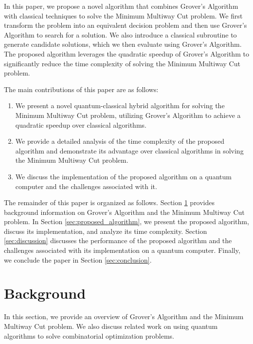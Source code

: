In this paper, we propose a novel algorithm that combines Grover's Algorithm with classical techniques to solve the Minimum Multiway Cut problem. We first transform the problem into an equivalent decision problem and then use Grover's Algorithm to search for a solution. We also introduce a classical subroutine to generate candidate solutions, which we then evaluate using Grover's Algorithm. The proposed algorithm leverages the quadratic speedup of Grover's Algorithm to significantly reduce the time complexity of solving the Minimum Multiway Cut problem.

The main contributions of this paper are as follows:

\begin{enumerate}
    \item We present a novel quantum-classical hybrid algorithm for solving the Minimum Multiway Cut problem, utilizing Grover's Algorithm to achieve a quadratic speedup over classical algorithms.
    
    \item We provide a detailed analysis of the time complexity of the proposed algorithm and demonstrate its advantage over classical algorithms in solving the Minimum Multiway Cut problem.
    
    \item We discuss the implementation of the proposed algorithm on a quantum computer and the challenges associated with it.
\end{enumerate}

The remainder of this paper is organized as follows. Section \ref{sec:background} provides background information on Grover's Algorithm and the Minimum Multiway Cut problem. In Section \ref{sec:proposed_algorithm}, we present the proposed algorithm, discuss its implementation, and analyze its time complexity. Section \ref{sec:discussion} discusses the performance of the proposed algorithm and the challenges associated with its implementation on a quantum computer. Finally, we conclude the paper in Section \ref{sec:conclusion}.

\section{Background}
\label{sec:background}
In this section, we provide an overview of Grover's Algorithm and the Minimum Multiway Cut problem. We also discuss related work on using quantum algorithms to solve combinatorial optimization problems.

